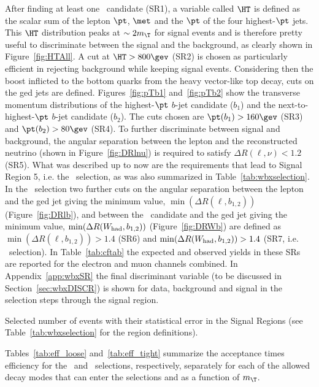 After finding at least one \whad\ candidate (SR1), a variable called $\HT$ is defined
as the scalar sum of the lepton $\pt$, $\met$ and the $\pt$
of the four  highest-$\pt$ jets. This $\HT$ distribution peaks at 
$\sim 2 m_{\T}$ for signal events and is therefore pretty useful to
discriminate between the signal and the background, as clearly shown
in Figure~\ref{fig:HTAll}. A cut at $\HT>800\gev$ (SR2) is chosen as particularly
efficient in rejecting background while keeping signal events.
Considering then the boost inflicted to the bottom quarks from the heavy
vector-like top decay, cuts on the \btag ged jets are defined.
Figures~\ref{fig:pTb1} and~\ref{fig:pTb2} show the transverse momentum distributions
of the highest-$\pt$ $b$-jet candidate ($b_1$) and 
the next-to-highest-$\pt$ $b$-jet candidate ($b_2$).
The cuts chosen are $\pt(b_1) > 160\gev$ (SR3) and $\pt(b_2) >80\gev$ (SR4).
To further discriminate between signal and background,
the angular separation between the lepton and the reconstructed neutrino 
(shown in Figure~\ref{fig:DRlnu}) is
required to satisfy $\Delta R(\ell,\nu)<1.2$ (SR5). What was described up to now 
are the requirements that lead to Signal Region 5, i.e. the \loose\ selection, as was
also summarized in Table~\ref{tab:wbxselection}. In the \tight\ selection
two further cuts on the angular separation between the lepton and the \btag ged
jet giving the minimum value, $\min(\Delta R(\ell, b_{1,2}))$ (Figure~\ref{fig:DRlb}), 
and between the
\whad\ candidate and the \btag ged jet giving the minimum value, 
$\min(\Delta R(W_{\rm had}, b_{1,2}))$ (Figure~\ref{fig:DRWb}) are defined as
 $\min(\Delta R(\ell, b_{1,2}))>1.4$ (SR6) and 
$\min(\Delta R(W_{\rm had}, b_{1,2}))>1.4$ (SR7, i.e. \tight\ selection).
In Table~\ref{tab:cftab} the expected and observed yields in these SRs are
reported for the electron and muon channels combined. In Appendix~\ref{app:wbxSR}
the final discriminant variable (to be discussed in Section~\ref{sec:wbxDISCR})
is shown for data, background and signal in the selection steps through the
signal region.

\begin{table}[htb]\centering
        
        \caption{Selected number of events with their statistical error
        in the Signal Regions (see Table~\ref{tab:wbxselection} for the
        region definitions).}\label{tab:cftab}
\end{table}



Tables~\ref{tab:eff_loose} and~\ref{tab:eff_tight} 
summarize the acceptance times efficiency for the \loose\ and \tight\ selections, 
respectively,
separately for each of the allowed \TTbar decay modes that can enter
the selections and as a function of $m_{\T}$.

